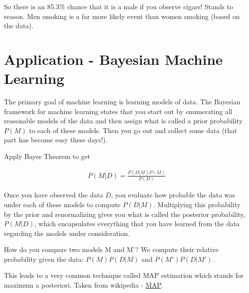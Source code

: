 \documentclass[12pt]{article}
\begin{document}
So there is an 85.3\% chance that it is a male if you observe cigars! Stands to reason. Men smoking is a far more likely event than women smoking (based on the data). 

\section*{Application - Bayesian Machine Learning}

The primary goal of machine learning is learning models of data. 
The Bayesian framework for machine learning states that you start out by enumerating all reasonable models of the data and then assign what is called a prior probability $P(M)$ to each of these models. Then you go out and collect some data (that part has become easy these days!). 

Apply Bayes Theorem to get

\begin{align*}
P(M|D) = \frac{P(D|M)P(M)}{P(D)}
\end{align*}

Once you have observed the data $D$, you evaluate how probable the data was under each of these models to compute $P(D|M)$. Multiplying this probability by the prior and renormalizing gives you what is called the posterior probability, $P(M|D)$, which encapsulates everything that you have learned from the data regarding the models under consideration. 

How do you compare two models M and M'? We compute their relative probability given the data: $P(M)P(D|M)$ and $P(M')P(D|M')$.

This leads to a very common technique called MAP estimation which stands for maximum a posteriori. Taken from wikipedia - \href{http://en.wikipedia.org/wiki/Maximum_a_posteriori_estimation}{MAP}.
\end{document}
